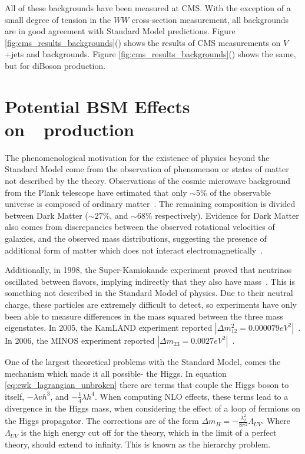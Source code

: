 \par All of these backgrounds have been measured at CMS.  With the
exception of a small degree of tension in the $WW$ cross-section
measurement, all backgrounds are in good agreement with Standard Model
predictions.  Figure
\ref{fig:cms_results_backgrounds}()
shows the results of CMS measurements on $V$+jets and \ttjets
backgrounds.  Figure
\ref{fig:cms_results_backgrounds}() shows
the same, but for diBoson production.  
 

\section{Potential BSM Effects on~\ttH~production}
\label{bsm_effects_overview}

\par The phenomenological motivation for the existence of physics beyond
the Standard Model come from the observation of phenomenon or states
of matter not described by the theory.  Observations of the cosmic microwave background
from the Plank telescope have estimated that only $\sim5\%$ of the
observable universe is composed of ordinary
matter~\cite{BSM_Planck}. The remaining composition is divided between  
Dark Matter ($\sim27\%$, and $\sim68\%$ respectively).  Evidence for
Dark Matter also comes from discrepancies between the observed
rotational velocities of galaxies, and the observed mass
distributions, suggesting the presence of additional form of matter
which does not interact
electromagnetically~\cite{BSM_Rubin_DM_GalaxyRotations}.

\par Additionally, in 1998, the Super-Kamiokande experiment proved that
neutrinos oscillated between flavors, implying indirectly that they
also have mass~\cite{BSM_superK}.  This is something not described in
the Standard Model of physics.  Due to their neutral charge, these
particles  are extremely difficult to detect, so experiments have only
been able to measure differences in the mass squared between the three
mass eigenstates.  In 2005, the KamLAND experiment reported
$|{\Delta}m^{2}_{12}=0.000079
eV^{2}|$~\cite{BSM_neutrinoDeltaM12_kamland}.  In 2006, the MINOS
experiment reported
$|{\Delta}m_{23}=0.0027 eV^{2}|$~\cite{BSM_neutrinoDeltaM23_minos}.

\par One of the largest theoretical problems with the Standard Model,
comes the mechanism which made it all possible- the Higgs.  In
equation \ref{eq:ewk_lagrangian_unbroken} there are terms that couple
the Higgs boson to itself, $-{\lambda}vh^{3}$, and
$-\frac{1}{4}{\lambda}h^{4}$.  When computing NLO effects, these terms
lead to a divergence in the Higgs mass, when considering the effect of
a loop of fermions on the Higgs propagator.  The corrections are of the form ${\Delta}m_{H} =
-\frac{\lambda_{f}^{2}}{8\pi^{2}}\Lambda_{UV}$.  Where $\Lambda_{UV}$
is the high energy cut off for the theory, which in the limit of a
perfect theory, should extend to infinity.  This is known as the
hierarchy problem.  

